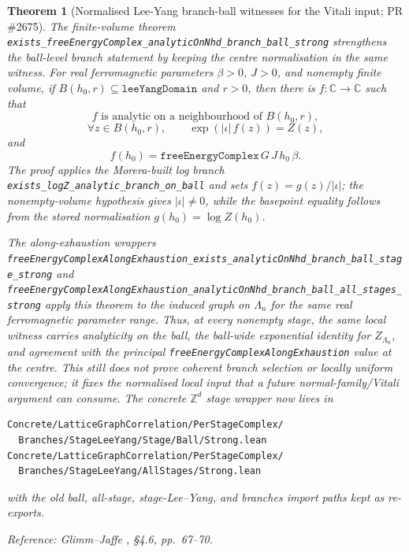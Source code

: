 \documentclass[a4paper,11pt]{article}
\newtheorem{theorem}{Theorem}
\begin{document}
\begin{theorem}[Normalised Lee-Yang branch-ball witnesses for the Vitali input; PR \#2675]
The finite-volume theorem
\texttt{exists\_freeEnergyComplex\_analyticOnNhd\_branch\_ball\_strong}
strengthens the ball-level branch statement by keeping the centre
normalisation in the same witness.  For real ferromagnetic parameters
$\beta>0$, $J>0$, and nonempty finite volume, if
$B(h_0,r)\subseteq\texttt{leeYangDomain}$ and $r>0$, then there is
$f:\mathbb C\to\mathbb C$ such that
\[
  f \text{ is analytic on a neighbourhood of } B(h_0,r),
\]
\[
  \forall z\in B(h_0,r),\qquad
  \exp(|\iota|\,f(z))=Z(z),
\]
and
\[
  f(h_0)=\texttt{freeEnergyComplex}\,G\,J\,h_0\,\beta .
\]
The proof applies the Morera-built log branch
\texttt{exists\_logZ\_analytic\_branch\_on\_ball} and sets
$f(z)=g(z)/|\iota|$; the nonempty-volume hypothesis gives
$|\iota|\ne 0$, while the basepoint equality follows from the stored
normalisation $g(h_0)=\log Z(h_0)$.

The along-exhaustion wrappers
\texttt{freeEnergyComplexAlongExhaustion\_exists\_analyticOnNhd\_branch\_ball\_stage\_strong}
and
\texttt{freeEnergyComplexAlongExhaustion\_analyticOnNhd\_branch\_ball\_all\_stages\_strong}
apply this theorem to the induced graph on $\Lambda_n$ for the same real
ferromagnetic parameter range.  Thus, at every nonempty stage, the same
local witness carries analyticity on the ball,
the ball-wide exponential identity for $Z_{\Lambda_n}$, and agreement
with the principal \texttt{freeEnergyComplexAlongExhaustion} value at
the centre.  This still does not prove coherent branch selection or
locally uniform convergence; it fixes the normalised local input that a
future normal-family/Vitali argument can consume.
The concrete $\mathbb Z^d$ stage wrapper now lives in
\begin{Verbatim}[fontsize=\footnotesize]
Concrete/LatticeGraphCorrelation/PerStageComplex/
  Branches/StageLeeYang/Stage/Ball/Strong.lean
Concrete/LatticeGraphCorrelation/PerStageComplex/
  Branches/StageLeeYang/AllStages/Strong.lean
\end{Verbatim}
with the old ball, all-stage, stage-Lee--Yang, and branches import paths
kept as re-exports.

Reference: Glimm--Jaffe \cite{glimm-jaffe}, \S 4.6, pp.~67--70.
\end{theorem}
\end{document}
